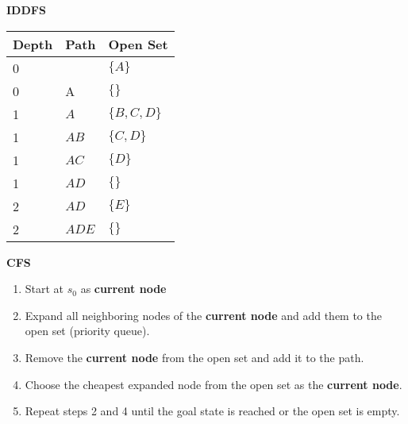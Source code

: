 \begin{example} \textbf{IDDFS}
    \begin{center}
        \begin{tabular}{lll}
        \toprule
        \textbf{Depth} & \textbf{Path} & \textbf{Open Set} \\
        \midrule
        0 & & $\{A\}$ \\
        0 & A & $\{\}$ \\
        \midrule
        1 & $A$ & $\{B, C, D\}$ \\
        1 & $AB$ & $\{C, D\}$ \\
        1 & $AC$ & $\{D\}$ \\
        1 & $AD$ & $\{\}$ \\
        \midrule
        2 & $AD$ & $\{E\}$ \\
        2 & $ADE$ & $\{\}$ \\
        \bottomrule
        \end{tabular}
    \end{center}
\end{example}

\begin{process} \textbf{CFS}
    \begin{enumerate}
        \item Start at $s_0$ as \textbf{current node}
        \item Expand all neighboring nodes of the \textbf{current node} and add them to the open set (priority queue).
        \item Remove the \textbf{current node} from the open set and add it to the path. 
        \item Choose the cheapest expanded node from the open set as the \textbf{current node}.
        \item Repeat steps 2 and 4 until the goal state is reached or the open set is empty.
    \end{enumerate}
\end{process}

